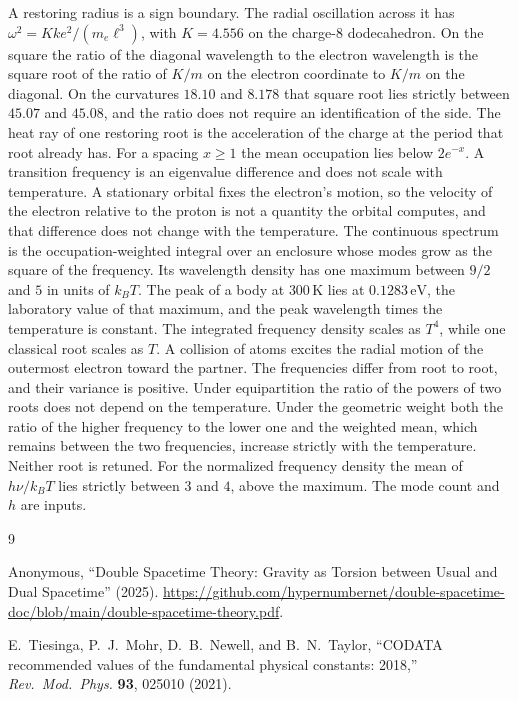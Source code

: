\documentclass[a4paper]{article}
\begin{document}
A restoring radius is a sign boundary. The radial oscillation across it has \(\omega^{2}=K k e^{2}/(m_e\ell^{3})\), with \(K=4.556\) on the charge-\(8\) dodecahedron. On the square the ratio of the diagonal wavelength to the electron wavelength is the square root of the ratio of \(K/m\) on the electron coordinate to \(K/m\) on the diagonal. On the curvatures \(18.10\) and \(8.178\) that square root lies strictly between \(45.07\) and \(45.08\), and the ratio does not require an identification of the side. The heat ray of one restoring root is the acceleration of the charge at the period that root already has. For a spacing \(x\ge 1\) the mean occupation lies below \(2e^{-x}\). A transition frequency is an eigenvalue difference and does not scale with temperature. A stationary orbital fixes the electron's motion, so the velocity of the electron relative to the proton is not a quantity the orbital computes, and that difference does not change with the temperature. The continuous spectrum is the occupation-weighted integral over an enclosure whose modes grow as the square of the frequency. Its wavelength density has one maximum between \(9/2\) and \(5\) in units of \(k_B T\). The peak of a body at \(300\,\mathrm{K}\) lies at \(0.1283\,\mathrm{eV}\), the laboratory value of that maximum, and the peak wavelength times the temperature is constant. The integrated frequency density scales as \(T^{4}\), while one classical root scales as \(T\). A collision of atoms excites the radial motion of the outermost electron toward the partner. The frequencies differ from root to root, and their variance is positive. Under equipartition the ratio of the powers of two roots does not depend on the temperature. Under the geometric weight both the ratio of the higher frequency to the lower one and the weighted mean, which remains between the two frequencies, increase strictly with the temperature. Neither root is retuned. For the normalized frequency density the mean of \(h\nu/k_B T\) lies strictly between \(3\) and \(4\), above the maximum. The mode count and \(h\) are inputs.

\begin{thebibliography}{9}
\raggedright

Anonymous,
``Double Spacetime Theory: Gravity as Torsion between Usual and Dual Spacetime'' (2025).
\url{https://github.com/hypernumbernet/double-spacetime-doc/blob/main/double-spacetime-theory.pdf}.

E.~Tiesinga, P.~J.~Mohr, D.~B.~Newell, and B.~N.~Taylor,
``CODATA recommended values of the fundamental physical constants: 2018,''
\textit{Rev.\ Mod.\ Phys.} \textbf{93}, 025010 (2021).

\end{thebibliography}
\end{document}
